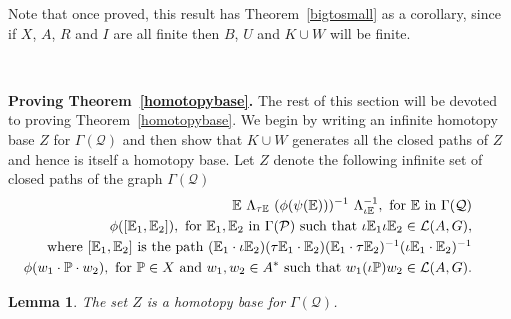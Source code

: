 \documentclass[11pt]{amsart}
\newtheorem{lem}{Lemma}
\theoremstyle{plain}
\begin{document}
Note that once proved, this result has Theorem~\ref{bigtosmall} as a corollary, since if $X$, $A$, $R$ and $I$ are all finite then $B$, $U$ and $K \cup W$ will be finite.

\

\noindent \textbf{Proving Theorem~\ref{homotopybase}.} The rest of this section will be devoted to proving Theorem~\ref{homotopybase}.
We begin by writing an infinite homotopy base $Z$ for $\Gamma(\mathcal{Q})$ and then show that $K \cup W$ generates all the closed paths of $Z$ and hence is itself a homotopy base. Let $Z$ denote the following infinite set of closed paths of the graph $\Gamma(\mathcal{Q})$
\begin{align}
\mathbb{E} \ \Lambda_{\tau \mathbb{E}} \ (\phi ( \psi (\mathbb{E})))^{-1} \ {\Lambda^{-1}_{\iota \mathbb{E}}}, \ \mbox{for} \ \mathbb{E} \ \mbox{in} \ \Gamma({\mathcal{Q}}) & & \ \  \label{z1} \\
\phi([\mathbb{E}_1,\mathbb{E}_2]), \ \mbox{for} \  \mathbb{E}_1, \mathbb{E}_2 \ \mbox{in} \  \Gamma({\mathcal{P}}) \ \mbox{such that} \  \iota \mathbb{E}_1 \iota \mathbb{E}_2 \in {\mathcal{L}({A,G})}, & &  \  \ \label{z2} \\
 \quad \mbox{where $[\mathbb{E}_1, \mathbb{E}_2]$ is the path $(\mathbb{E}_1 \cdot \iota \mathbb{E}_2)
(\tau \mathbb{E}_1 \cdot \mathbb{E}_2)
(\mathbb{E}_1 \cdot \tau \mathbb{E}_2)^{-1}
(\iota \mathbb{E}_1 \cdot \mathbb{E}_2)^{-1}$} & & \notag \\
\phi(w_1 \cdot \mathbb{P} \cdot w_2), \ \mbox{for} \  \mathbb{P} \in {X} \ \mbox{and} \  w_1, w_2 \in A^* \ \mbox{such that} \ w_1 (\iota \mathbb{P}) w_2 \in {\mathcal{L}({A,G})}. & & \  \ \label{z3}
\end{align}
\begin{lem}
The set $Z$ is a homotopy base for $\Gamma(\mathcal{Q})$.
\end{lem}
\end{document}
